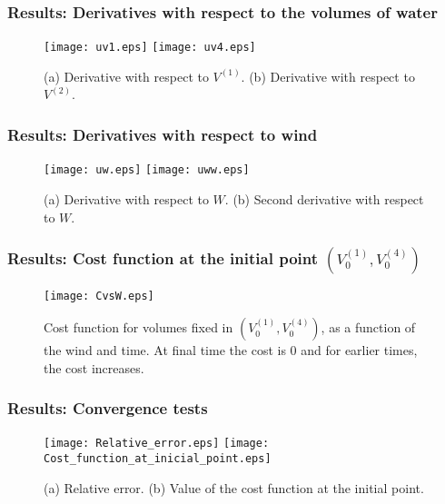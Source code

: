 \documentclass[aspectratio=169]{beamer}\usepackage[utf8]{inputenc}
\begin{document}
\begin{frame}\frametitle{Results: Derivatives with respect to the volumes of water}
\begin{figure}[ht!]
\centering
\subfigure
{\texttt{[image: uv1.eps]}}
\qquad
\subfigure
{\texttt{[image: uv4.eps]}}
\caption
{(a) Derivative with respect to $V^{(1)}$. (b) Derivative with respect to $V^{(2)}$.}
\end{figure}
\end{frame}

\begin{frame}\frametitle{Results: Derivatives with respect to wind}
\begin{figure}[ht!]
\centering
\subfigure
{\texttt{[image: uw.eps]}}
\qquad
\subfigure
{\texttt{[image: uww.eps]}}
\caption
{(a) Derivative with respect to $W$. (b) Second derivative with respect to $W$.}
\end{figure}
\end{frame}

\begin{frame}\frametitle{Results: Cost function at the initial point $\left(V^{(1)}_0,V^{(4)}_0\right)$}
\begin{figure}[h!]
\centering
\texttt{[image: CvsW.eps]}
\caption{Cost function for volumes fixed in $\left(V^{(1)}_0,V^{(4)}_0\right)$, as a function of the wind and time. At final time the cost is 0 and for earlier times, the cost increases.}
\end{figure}
\end{frame}

\begin{frame}\frametitle{Results: Convergence tests}
\begin{figure}[ht!]
\centering
\subfigure
{\texttt{[image: Relative\_error.eps]}}
\qquad
\subfigure
{\texttt{[image: Cost\_function\_at\_inicial\_point.eps]}}
\caption
{(a) Relative error. (b) Value of the cost function at the initial point.}
\end{figure}
\end{frame}
\end{document}
